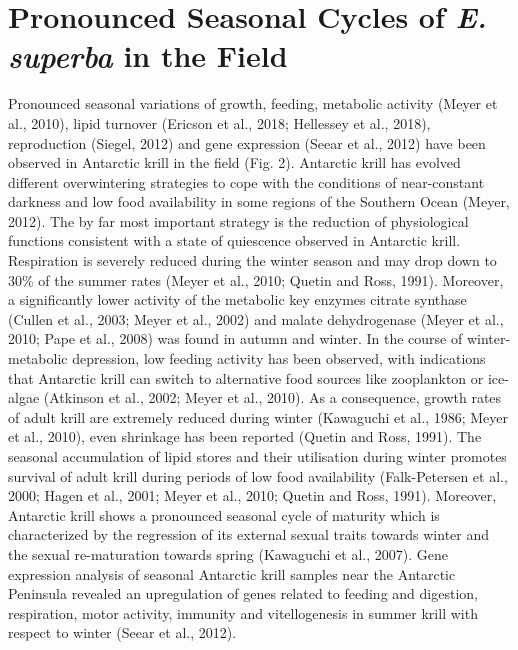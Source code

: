 \section{Pronounced Seasonal Cycles of \textit{E. superba} in the Field}
Pronounced seasonal variations of growth, feeding, metabolic activity (Meyer et al., 2010), lipid turnover (Ericson et al., 2018; Hellessey et al., 2018), reproduction (Siegel, 2012) and gene expression (Seear et al., 2012) have been observed in Antarctic krill in the field (Fig. 2). Antarctic krill has evolved different overwintering strategies to cope with the conditions of near-constant darkness and low food availability in some regions of the Southern Ocean (Meyer, 2012). The by far most important strategy is the reduction of physiological functions consistent with a state of quiescence observed in Antarctic krill. Respiration is severely reduced during the winter season and may drop down to 30\% of the summer rates (Meyer et al., 2010; Quetin and Ross, 1991). Moreover, a significantly lower activity of the metabolic key enzymes citrate synthase (Cullen et al., 2003; Meyer et al., 2002) and malate dehydrogenase (Meyer et al., 2010; Pape et al., 2008) was found in autumn and winter. In the course of winter-metabolic depression, low feeding activity has been observed, with indications that Antarctic krill can switch to alternative food sources like zooplankton or ice-algae (Atkinson et al., 2002; Meyer et al., 2010). As a consequence, growth rates of adult krill are extremely reduced during winter (Kawaguchi et al., 1986; Meyer et al., 2010), even shrinkage has been reported (Quetin and Ross, 1991). The seasonal accumulation of lipid stores and their utilisation during winter promotes survival of adult krill during periods of low food availability (Falk-Petersen et al., 2000; Hagen et al., 2001; Meyer et al., 2010; Quetin and Ross, 1991). Moreover, Antarctic krill shows a pronounced seasonal cycle of maturity which is characterized by the regression of its external sexual traits towards winter and the sexual re-maturation towards spring (Kawaguchi et al., 2007). Gene expression analysis of seasonal Antarctic krill samples near the Antarctic Peninsula revealed an upregulation of genes related to feeding and digestion, respiration, motor activity, immunity and vitellogenesis in summer krill with respect to winter (Seear et al., 2012).

